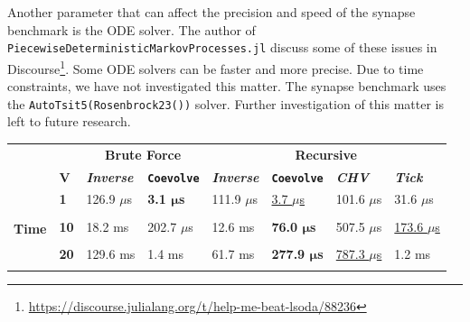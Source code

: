 \documentclass{juliacon}
\begin{document}
Another parameter that can affect the precision and speed of the synapse benchmark is the ODE solver. The author of \texttt{PiecewiseDeterministicMarkovProcesses.jl} discuss some of these issues in Discourse\footnote{\url{https://discourse.julialang.org/t/help-me-beat-lsoda/88236}}. Some ODE solvers can be faster and more precise. Due to time constraints, we have not investigated this matter. The synapse benchmark uses the \texttt{AutoTsit5(Rosenbrock23())} solver. Further investigation of this matter is left to future research. 

\begin{table}
\centering
\begin{tabular}{clllllll} 
\toprule
\multicolumn{1}{l}{} &  & \multicolumn{2}{c}{\textbf{Brute Force }} & \multicolumn{4}{c}{\textbf{Recursive}} \\
\multicolumn{1}{l}{} & \textbf{V} & \textbf{\textit{Inverse}} & \textbf{\texttt{Coevolve}} & \textbf{\textit{Inverse}} & \textbf{\texttt{Coevolve}} & \textbf{\textit{CHV}} & \textbf{\textit{Tick}} \\ 
\hline
\multirow{20}{*}{\textbf{Time}} & \textbf{1}  & 126.9 \( \mu \)s  & \textbf{3.1 \( \bm{\mu} \)s} & 111.9 \( \mu \)s & \underline{3.7 \( \mu \)s}     & 101.6 \( \mu \)s             & 31.6 \( \mu \)s              \\
                                &             &                   &                              &                  &                                &                              &                              \\
                                & \textbf{10} & 18.2 ms           & 202.7 \( \mu \)s             & 12.6 ms          & \textbf{76.0 \( \bm{\mu} \)s}  & 507.5 \( \mu \)s             & \underline{173.6 \( \mu \)s} \\
                                &             &                   &                              &                  &                                &                              &                              \\
                                & \textbf{20} & 129.6 ms          & 1.4 ms                       & 61.7 ms          & \textbf{277.9 \( \bm{\mu} \)s} & \underline{787.3 \( \mu \)s} & 1.2 ms                       \\
                                &             &                   &                              &                  &                                &                              &                              \\

\end{tabular}
\end{table}
\end{document}
